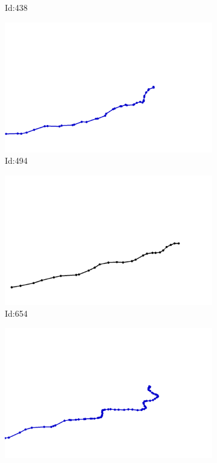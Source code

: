 \documentclass[12pt,twoside]{report}
\begin{document}
\begin{figure}
\begin{subfigure}[b]{0.20\textwidth}
\caption{Id:438}
\end{subfigure}
\begin{subfigure}[b]{0.20\textwidth}
\centering
\includegraphics[width=\textwidth]{../../trajectories/494.png}
\caption{Id:494}
\end{subfigure}
\begin{subfigure}[b]{0.20\textwidth}
\centering
\includegraphics[width=\textwidth]{../../trajectories/654.png}
\caption{Id:654}
\end{subfigure}
\begin{subfigure}[b]{0.20\textwidth}
\centering
\includegraphics[width=\textwidth]{../../trajectories/700.png}

\end{subfigure}
\end{figure}
\end{document}
